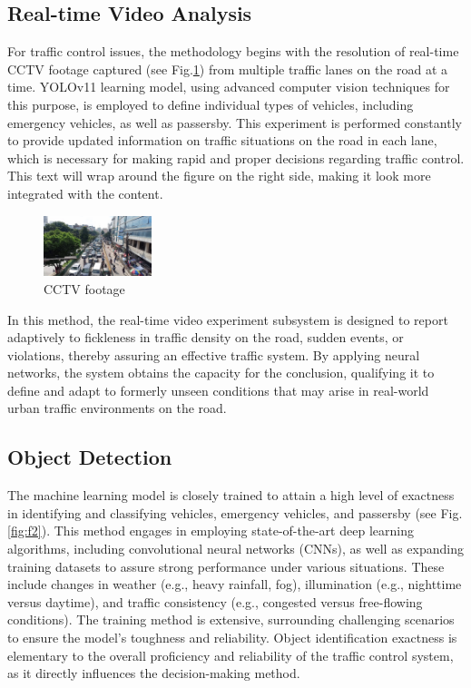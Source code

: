 \documentclass[usenatbib]{tjaa}
\begin{document}
\subsection{Real-time Video Analysis}
For traffic control issues, the methodology begins with the resolution of real-time CCTV footage captured (see Fig.\ref{fig:f1}) from multiple traffic lanes on the road at a time. YOLOv11 learning model, using advanced computer vision techniques for this purpose, is employed to define individual types of vehicles, including emergency vehicles, as well as passersby. This experiment is performed constantly to provide updated information on traffic situations on the road in each lane, which is necessary for making rapid and proper decisions regarding traffic control. This text will wrap around the figure on the right side, making it look more integrated with the content.

\begin{figure}
    \centering
    \includegraphics[width=0.28\textwidth]{7.jpg}
    \caption{CCTV footage} %
    \label{fig:f1} %
\end{figure}

In this method, the real-time video experiment subsystem is designed to report adaptively to fickleness in traffic density on the road, sudden events, or violations, thereby assuring an effective traffic system. By applying neural networks, the system obtains the capacity for the conclusion, qualifying it to define and adapt to formerly unseen conditions that may arise in real-world urban traffic environments on the road.

\subsection{Object Detection}
The machine learning model is closely trained to attain a high level of exactness in identifying and classifying vehicles, emergency vehicles, and passersby (see Fig. \ref{fig:f2}). This method engages in employing state-of-the-art deep learning algorithms, including convolutional neural networks (CNNs), as well as expanding training datasets to assure strong performance under various situations. These include changes in weather (e.g., heavy rainfall, fog), illumination (e.g., nighttime versus daytime), and traffic consistency (e.g., congested versus free-flowing conditions). The training method is extensive, surrounding challenging scenarios to ensure the model's toughness and reliability. Object identification exactness is elementary to the overall proficiency and reliability of the traffic control system, as it directly influences the decision-making method. 
\end{document}
